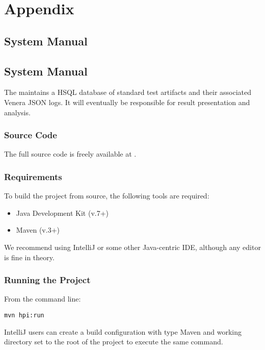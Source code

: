\section{Appendix}
\label{sec:appendix}

\subsection{\venera System Manual}

\subsection{\jenkinsPlugin System Manual}

The \jenkinsPlugin maintains a HSQL database of standard test artifacts
and their associated Venera JSON logs. It will eventually be responsible for
\venera result presentation and analysis.

\subsubsection{Source Code}

The full source code is freely available at \cite{heisentestPlugin}.

\subsubsection{Requirements}

To build the project from source, the following tools are required:

\begin{itemize}
  \item Java Development Kit (v.7+) \cite{jdk}
  \item Maven (v.3+) \cite{maven}
\end{itemize}

We recommend using IntelliJ \cite{intellij} or some other Java-centric IDE,
although any editor is fine in theory.

\subsubsection{Running the Project}

From the command line:

\begin{lstlisting}[numbers=none]
mvn hpi:run
\end{lstlisting}

IntelliJ users can create a build configuration with type Maven and working
directory set to the root of the project to execute the same command.

